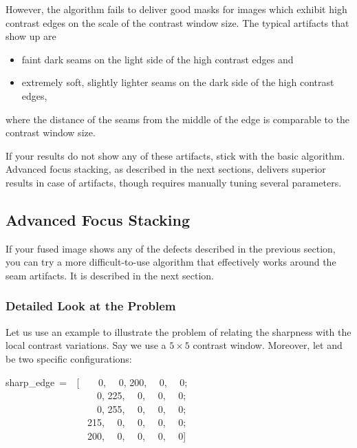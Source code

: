 However, the algorithm fails to deliver good masks for images which exhibit high contrast edges
on the scale of the contrast window size.  The typical artifacts that show up are

\begin{itemize}
\item
  faint dark seams on the light side of the high contrast edges and

\item
  extremely soft, slightly lighter seams on the dark side of the high contrast edges,
\end{itemize}

\noindent where the distance of the seams from the middle of the edge is comparable to the
contrast window size.

If your results do not show any of these artifacts, stick with the basic algorithm.  Advanced
focus stacking, as described in the next sections, delivers superior results in case of
artifacts, though requires manually tuning several parameters.


\subsection[Advanced Focus Stacking]{\label{sec:advanced-focus-stacking}%
  Advanced Focus Stacking}

If your fused image shows any of the defects described in the previous section, you can try a
more difficult-to-use algorithm that effectively works around the seam artifacts.  It is
described in the next section.


\subsubsection[Detailed Look at the Problem]{\label{sec:detailed-look-at-the-problem}%
  Detailed Look at the Problem}

Let us use an example to illustrate the problem of relating the sharpness with the local
contrast variations.  Say we use a $5 \times 5$ contrast window.  Moreover, let
 and  be two specific configurations:

\begin{literal}
  sharp\_edge~=~~[~~~~0,  ~~0,  200,  ~~0,  ~~0; \\
    ~~~~~~~~~~~~~~~~~~~0,  225,  ~~0,  ~~0,  ~~0; \\
    ~~~~~~~~~~~~~~~~~~~0,  255,  ~~0,  ~~0,  ~~0; \\
    ~~~~~~~~~~~~~~~~~215,  ~~0,  ~~0,  ~~0,  ~~0; \\
    ~~~~~~~~~~~~~~~~~200,  ~~0,  ~~0,  ~~0,  ~~0]
\end{literal}

